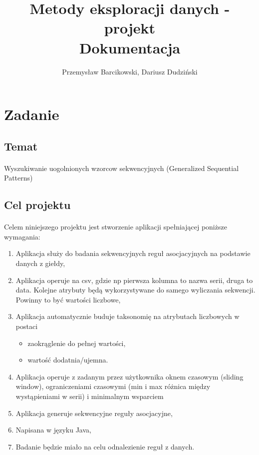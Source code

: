 \documentclass[11pt,a4paper]{article}
\title{ \textbf{Metody eksploracji danych - projekt} \\ \Large Dokumentacja}
\author{Przemysław Barcikowski, Dariusz Dudziński}
\begin{document}
\maketitle
\section{Zadanie}
\subsection{Temat}
\paragraph{} Wyszukiwanie uogolnionych wzorcow sekwencyjnych (Generalized Sequential Patterns)
\subsection{Cel projektu}
\paragraph{} Celem niniejszego projektu jest stworzenie aplikacji spełniającej poniższe wymagania:
\begin{enumerate}
\item Aplikacja służy do badania sekwencyjnych reguł asocjacyjnych na podstawie danych z giełdy,
\item Aplikacja operuje na csv, gdzie np pierwsza kolumna to nazwa serii, druga to data. Kolejne atrybuty będą wykorzystywane do samego wyliczania sekwencji. Powinny to być wartości liczbowe,
\item Aplikacja automatycznie buduje taksonomię na atrybutach liczbowych w postaci
\begin{itemize}
\item zaokrąglenie do pełnej wartości,
\item wartość dodatnia/ujemna.
\end{itemize}
\item Aplikacja operuje z zadanym przez użytkownika oknem czasowym (sliding window), ograniczeniami czasowymi (min i max różnica między wystąpieniami w serii) i minimalnym wsparciem
\item Aplikacja generuje sekwencyjne reguły asocjacyjne,
\item Napisana w języku Java,
\item Badanie będzie miało na celu odnalezienie reguł z danych.
\end{enumerate}
\end{document}
